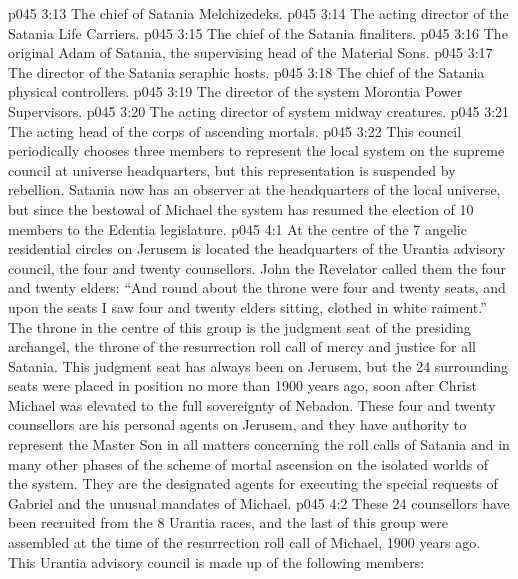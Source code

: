 \vs p045 3:13 \bibnobreakspace The chief of Satania Melchizedeks.
\vs p045 3:14 \bibnobreakspace The acting director of the Satania Life Carriers.
\vs p045 3:15 \bibnobreakspace The chief of the Satania finaliters.
\vs p045 3:16 \bibnobreakspace The original Adam of Satania, the supervising head of the Material Sons.
\vs p045 3:17 \bibnobreakspace The director of the Satania seraphic hosts.
\vs p045 3:18 \bibnobreakspace The chief of the Satania physical controllers.
\vs p045 3:19 \bibnobreakspace The director of the system Morontia Power Supervisors.
\vs p045 3:20 \bibnobreakspace The acting director of system midway creatures.
\vs p045 3:21 \bibnobreakspace The acting head of the corps of ascending mortals.
\vs p045 3:22 \pc This council periodically chooses three members to represent the local system on the supreme council at universe headquarters, but this representation is suspended by rebellion. Satania now has an observer at the headquarters of the local universe, but since the bestowal of Michael the system has resumed the election of 10 members to the Edentia legislature.
\vs p045 4:1 At the centre of the 7 angelic residential circles on Jerusem is located the headquarters of the Urantia advisory council, the four and twenty counsellors. John the Revelator called them the four and twenty elders: “And round about the throne were four and twenty seats, and upon the seats I saw four and twenty elders sitting, clothed in white raiment.” The throne in the centre of this group is the judgment seat of the presiding archangel, the throne of the resurrection roll call of mercy and justice for all Satania. This judgment seat has always been on Jerusem, but the 24 surrounding seats were placed in position no more than 1900 years ago, soon after Christ Michael was elevated to the full sovereignty of Nebadon. These four and twenty counsellors are his personal agents on Jerusem, and they have authority to represent the Master Son in all matters concerning the roll calls of Satania and in many other phases of the scheme of mortal ascension on the isolated worlds of the system. They are the designated agents for executing the special requests of Gabriel and the unusual mandates of Michael.
\vs p045 4:2 These 24 counsellors have been recruited from the 8 Urantia races, and the last of this group were assembled at the time of the resurrection roll call of Michael, 1900 years ago. This Urantia advisory council is made up of the following members:

